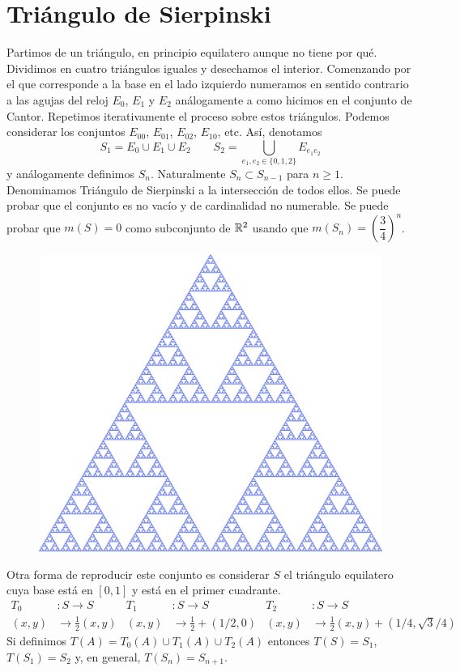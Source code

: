 \documentclass[FyPI.tex]{subfiles}
\begin{document}
\section{Triángulo de Sierpinski}
 Partimos de un triángulo, en principio equilatero aunque no tiene por qué. Dividimos en cuatro triángulos iguales y desechamos el interior. Comenzando por el que corresponde a la base en el lado izquierdo numeramos en sentido contrario a las agujas del reloj $E_0$, $E_1$ y $E_2$ análogamente a como hicimos en el conjunto de Cantor. Repetimos iterativamente el proceso sobre estos triángulos. Podemos considerar los conjuntos $E_{00}$, $E_{01}$, $E_{02}$, $E_{10}$, etc. Así, denotamos
$$
S_1 = E_0 \cup E_1 \cup E_2 \qquad S_2 = \bigcup_{e_1,e_2 \in \{0,1,2\}} E_{e_1 e_2}
$$
y análogamente definimos $S_n$. Naturalmente $S_n \subset S_{n-1}$ para $n\geq 1$. Denominamos Triángulo de Sierpinski a la intersección de todos ellos. Se puede probar que el conjunto es no vacío y de cardinalidad no numerable. Se puede probar que $m(S) = 0$ como subconjunto de $\mathbb{R}^2$ usando que $m(S_n)=\left(\dfrac{3}{4}\right)^n$.
\begin{figure}[h!]
\centering
\includegraphics[scale=0.2]{sierpi}
\end{figure}

Otra forma de reproducir este conjunto es considerar $S$ el triángulo equilatero cuya base está en $[0,1]$ y está en el primer cuadrante. 
\begin{align*}
T_0 &: S\to S & T_1&:S\to S & T_2&: S\to S \\
(x,y)& \to \frac{1}{2}(x,y) & (x,y) &\to \frac{1}{2}+ (1/2,0) & (x,y) & \to \frac{1}{2} (x,y)+(1/4,\sqrt{3}/4)
\end{align*}
Si definimos $T(A) = T_0(A)\cup T_1(A)\cup T_2(A)$ entonces $T(S) = S_1$, $T(S_1) = S_2$ y, en general, $T(S_n) = S_{n+1}$.
\end{document}
